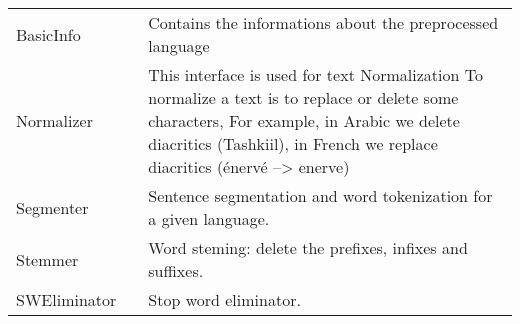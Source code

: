 \begin{tabular}{p{}p{}p{}} 
	\hline \hline
	
	BasicInfo && Contains the informations about the preprocessed language \\
	
	Normalizer	&& This interface is used for text Normalization To normalize a text is to replace or delete some characters, For example, in Arabic we delete diacritics (Tashkiil), in French we replace diacritics (énervé --> enerve) \\
	
	Segmenter && Sentence segmentation and word tokenization for a given language. \\
	
	Stemmer	&& Word steming: delete the prefixes, infixes and suffixes. \\
	
	SWEliminator && Stop word eliminator. \\
	
	\hline \hline
\end{tabular}